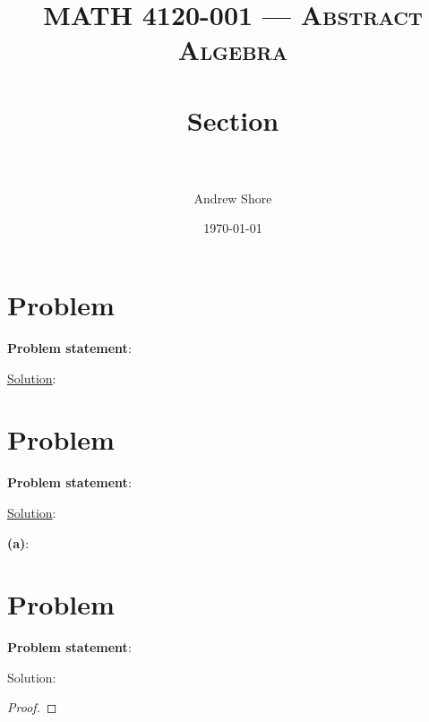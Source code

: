 \documentclass{article} %
\title{ 
\normalfont \normalsize 
\textsc{MATH 4120-001 --- Abstract Algebra} \\
\horrule{0.5pt} \\[0cm] %
\huge Section  \\ %
\horrule{2pt} \\[0cm] %
}
\author{Andrew Shore} %
\date{\normalsize\today} %
\begin{document}
\maketitle %

\section*{Problem }


\textbf{Problem statement}: 

\underline{Solution}: 
\begin{addmargin}[1em]{0em}

\end{addmargin}    



\section*{Problem }

\textbf{Problem statement}: 


\underline{Solution}: 
\begin{addmargin}[1em]{0em}
\textbf{(a)}:
\begin{addmargin}[1em]{0em}
\end{addmargin}
\end{addmargin}


\section*{Problem }


\textbf{Problem statement}: 

Solution: 
\begin{addmargin}[1em]{0em}
\begin{proof}

\end{proof}
\end{addmargin}

\end{document}
